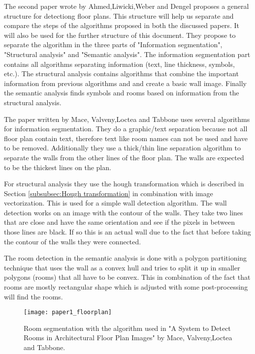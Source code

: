 The second paper wrote by Ahmed,Liwicki,Weber and Dengel proposes a general structure for detectiong floor plans. This structure will help us separate and compare the steps of the algorithms proposed in both the discussed papers. It will also be used for the further structure of this document. They propose to separate the algorithm in the three parts of "Information segmentation", "Structural analysis" and "Semantic analysis". The information segmentation part contains all algorithms separating information (text, line thickness, symbols, etc.). The structural analysis contains algorithms that combine the important information from previous algorithms and and create a basic wall image. Finally the semantic analysis finds symbols and rooms based on information from the structural analysis.

The paper written by Mace, Valveny,Loctea and Tabbone uses several algorithms for information segmentation. They do a graphic/text separation because not all floor plan contain text, therefore text like room names can not be used and have to be removed.  Additionally they use a thick/thin line separation algorithm to separate the walls from the other lines of the floor plan. The walls are expected to be the thickest lines on the plan.

For structural analysis they use the hough transformation which is described in Section \ref{subsubsec:Hough transformation} in combination with image vectorization. This is used for a simple wall detection algorithm. The wall detection works on an image with the contour of the walls. They take two lines that are close and have the same orientation and see if the pixels in between those lines are black. If so this is an actual wall due to the fact that before taking the contour of the walls they were connected. 

The room detection in the semantic analysis is done with a polygon partitioning technique that uses the wall as a convex hull and tries to split it up in smaller polygons (rooms) that all have to be convex. This in combination of the fact that rooms are mostly rectangular shape which is adjusted with some post-processing will find the rooms.

\begin{figure}[h]
	\centering
	\texttt{[image: paper1\_floorplan]}
	\caption{Room segmentation with the algorithm used in "A System to Detect Rooms in Architectural Floor Plan Images" by Mace, Valveny,Loctea and Tabbone. }
	\label{fig:paper1_floorplan}
\end{figure}

